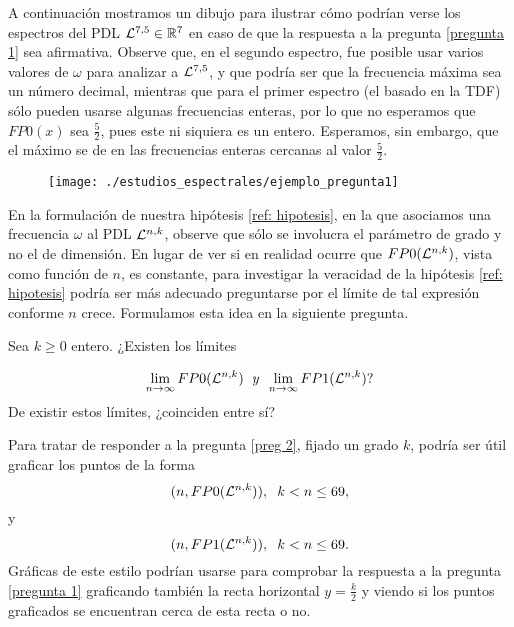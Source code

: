 A continuación mostramos un dibujo para
ilustrar cómo podrían verse los
espectros del PDL
$\mathcal{L}^{7,5} \in \mathbb{R}^{7}$
en caso de que la respuesta a la pregunta
\ref{pregunta 1} sea afirmativa.
Observe que, en el segundo espectro,
fue posible usar varios valores de $\omega$ para analizar
a $\mathcal{L}^{7,5}$, y que podría ser que la frecuencia máxima
sea un número decimal, mientras que para el primer espectro
(el basado en la TDF) sólo pueden usarse algunas frecuencias
enteras, por lo que no esperamos que 
$FP0(x)$
sea $\frac{5}{2}$, pues este ni siquiera es un entero.
Esperamos, sin embargo, que el máximo se de en las frecuencias
enteras cercanas al valor $\frac{5}{2}$.

\begin{figure}[H]
	\centering
	\texttt{[image: ./estudios\_espectrales/ejemplo\_pregunta1]} 
\end{figure}	

En la formulación de nuestra hipótesis \ref{ref: hipotesis},
en la que asociamos una frecuencia $\omega$
al PDL $\mathcal{L}^{n,k}$, observe que sólo se involucra el 
parámetro de grado y no el de dimensión.
En lugar de ver si en realidad ocurre que
$FP0(\mathcal{L}^{n,k})$, vista como función 
de $n$, es constante, 
para investigar la veracidad de la hipótesis \ref{ref: hipotesis}
podría ser más adecuado preguntarse
por el límite de tal expresión conforme $n$ crece.
Formulamos esta idea en la siguiente pregunta.

\begin{pregunta}
\label{preg 2}
Sea $k \geq 0$ entero. 
¿Existen los límites

\[
\lim\limits_{n \rightarrow \infty}{FP0(\mathcal{L}^{n,k})}
\hspace{0.2cm} \textit{y} \hspace{0.2cm}
\lim\limits_{n \rightarrow \infty}{FP1(\mathcal{L}^{n,k})} ?
\]
De existir estos límites, ¿coinciden entre sí?
\end{pregunta}

Para tratar de responder a la pregunta \ref{preg 2},
fijado un grado $k$,
podría ser útil graficar los puntos de la forma
\begin{equation}
\label{eq0: 8may}
(n, FP0(\mathcal{L}^{n,k})), \hspace{0.2cm} k < n \leq 69,
\end{equation}
y 
\begin{equation}
\label{eq1: 8may}
(n, FP1(\mathcal{L}^{n,k})), \hspace{0.2cm} k < n \leq 69.
\end{equation}
Gráficas de este estilo podrían usarse para comprobar
la respuesta a la pregunta \ref{pregunta 1} 
graficando también la recta horizontal $y = \frac{k}{2}$
y viendo si los puntos graficados se encuentran cerca
de esta recta o no. 

